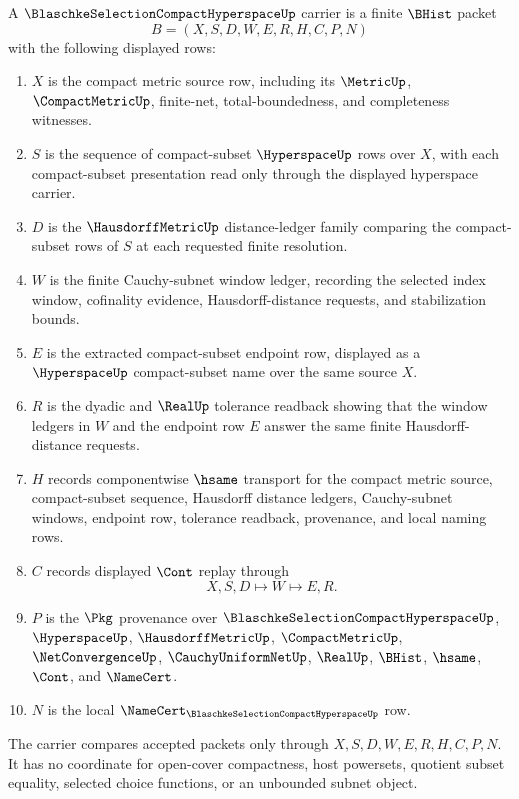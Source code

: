\begin{definition}
\label{def:blaschke-selection-compact-hyperspace-carrier}
A $\BlaschkeSelectionCompactHyperspaceUp$ carrier is a finite $\BHist$ packet
$$
B=(X,S,D,W,E,R,H,C,P,N)
$$
with the following displayed rows:
\begin{enumerate}
\item $X$ is the compact metric source row, including its $\MetricUp$, $\CompactMetricUp$, finite-net, total-boundedness, and completeness witnesses.
\item $S$ is the sequence of compact-subset $\HyperspaceUp$ rows over $X$, with each compact-subset presentation read only through the displayed hyperspace carrier.
\item $D$ is the $\HausdorffMetricUp$ distance-ledger family comparing the compact-subset rows of $S$ at each requested finite resolution.
\item $W$ is the finite Cauchy-subnet window ledger, recording the selected index window, cofinality evidence, Hausdorff-distance requests, and stabilization bounds.
\item $E$ is the extracted compact-subset endpoint row, displayed as a $\HyperspaceUp$ compact-subset name over the same source $X$.
\item $R$ is the dyadic and $\RealUp$ tolerance readback showing that the window ledgers in $W$ and the endpoint row $E$ answer the same finite Hausdorff-distance requests.
\item $H$ records componentwise $\hsame$ transport for the compact metric source, compact-subset sequence, Hausdorff distance ledgers, Cauchy-subnet windows, endpoint row, tolerance readback, provenance, and local naming rows.
\item $C$ records displayed $\Cont$ replay through
$$
X,S,D \longmapsto W \longmapsto E,R .
$$
\item $P$ is the $\Pkg$ provenance over $\BlaschkeSelectionCompactHyperspaceUp$, $\HyperspaceUp$, $\HausdorffMetricUp$, $\CompactMetricUp$, $\NetConvergenceUp$, $\CauchyUniformNetUp$, $\RealUp$, $\BHist$, $\hsame$, $\Cont$, and $\NameCert$.
\item $N$ is the local $\NameCert_{\BlaschkeSelectionCompactHyperspaceUp}$ row.
\end{enumerate}
The carrier compares accepted packets only through $X,S,D,W,E,R,H,C,P,N$. It has no coordinate for open-cover compactness, host powersets, quotient subset equality, selected choice functions, or an unbounded subnet object.
\end{definition}

